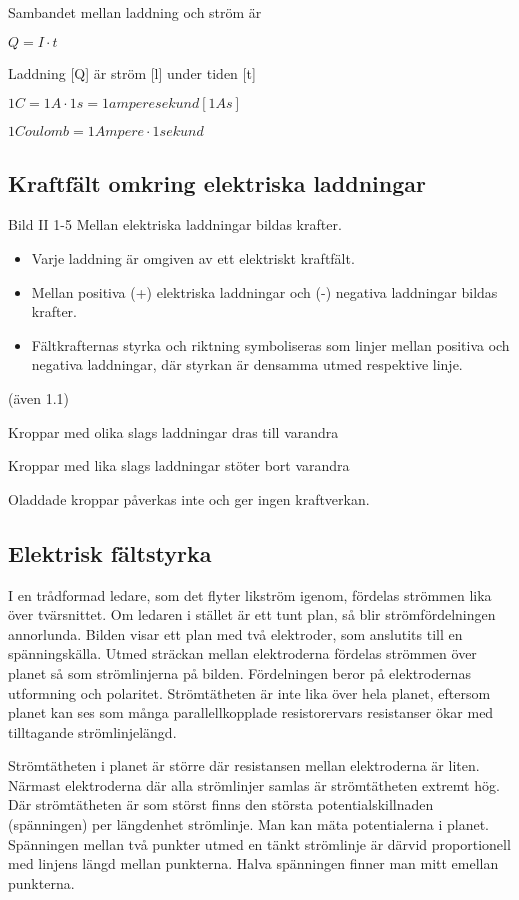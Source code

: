 \documentclass[a4paper,twoside,twocolumn,openright]{book}
\begin{document}
Sambandet mellan laddning och ström är

$Q = I \cdot t$

Laddning [Q] är ström [l] under tiden [t]

$1 C= 1 A ·1 s= 1 amperesekund [1 As]$

$1 Coulomb = 1 Ampere·1 sekund$

\subsection{Kraftfält omkring elektriska laddningar}

Bild II 1-5
Mellan elektriska laddningar bildas krafter.

\begin{itemize}
\item Varje laddning är omgiven av ett elektriskt kraftfält.
\item Mellan positiva (+) elektriska laddningar
och (-) negativa laddningar bildas krafter.
\item Fältkrafternas styrka och riktning symboliseras som linjer mellan positiva och
negativa laddningar, där styrkan är densamma utmed respektive linje.
\end{itemize}

(även 1.1)

Kroppar med olika slags laddningar dras
till varandra

Kroppar med lika slags laddningar stöter bort varandra

Oladdade kroppar påverkas inte och ger ingen kraftverkan.

\subsection{Elektrisk fältstyrka}

I en trådformad ledare, som det flyter likström igenom, fördelas strömmen lika över
tvärsnittet. Om ledaren i stället är ett tunt plan, så blir strömfördelningen annorlunda.
Bilden visar ett plan med två elektroder, som anslutits till en spänningskälla. Utmed
sträckan mellan elektroderna fördelas strömmen över planet så som strömlinjerna på bilden.
Fördelningen beror på elektrodernas utformning och polaritet. Strömtätheten är inte lika
över hela planet, eftersom planet kan ses som många parallellkopplade resistorervars
resistanser ökar med tilltagande strömlinjelängd.

Strömtätheten i planet är större där resistansen mellan elektroderna är liten. Närmast
elektroderna där alla strömlinjer samlas är strömtätheten extremt hög. Där strömtätheten
är som störst finns den största potentialskillnaden (spänningen) per längdenhet
strömlinje. Man kan mäta potentialerna i planet. Spänningen mellan två punkter utmed en
tänkt strömlinje är därvid proportionell med linjens längd mellan punkterna. Halva
spänningen finner man mitt emellan punkterna.
\end{document}
